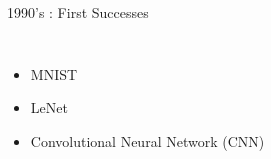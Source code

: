 \documentclass{irdbeamer}
\let\oldcite=\cite
\renewcommand{\cite}[1]{\textcolor[rgb]{.5,.5,.7}{\oldcite{#1}}}
\begin{document}
\begin{frame}[t]{1990's : First Successes}
\begin{columns}[t]
    \vspace{1cm}
    \begin{itemize}
        \item<1-> MNIST\\ \cite{lecun1998mnist}
        \item<2-> LeNet\\ \cite{lecun1989backpropagation}
        \item<3-> Convolutional Neural Network (CNN)\\ \cite{lecun1989generalization}
    \end{itemize}
\end{columns}
\end{frame}
\end{document}
